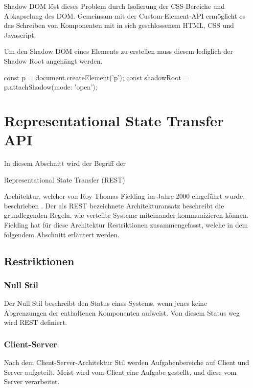 Shadow DOM löst dieses Problem durch Isolierung der CSS-Bereiche und Abkapselung des DOM. 
Gemeinsam mit der Custom-Element-API ermöglicht es das Schreiben von Komponenten mit in sich geschlossenem HTML, CSS und Javascript.


Um den Shadow DOM eines Elements zu erstellen muss diesem lediglich der Shadow Root angehängt werden.
\begin{JsCode}
	const p = document.createElement('p');
	const shadowRoot = p.attachShadow({mode: 'open'});
\end{JsCode}


\section{Representational State Transfer  API}
In diesem Abschnitt wird der Begriff der \begin{english}
Representational State Transfer (REST)
\end{english} Architektur, welcher von Roy Thomas Fielding im Jahre 2000 eingeführt wurde, beschrieben \cite{rest}.
Der als REST bezeichnete Architekturansatz beschreibt die grundlegenden Regeln, wie verteilte Systeme miteinander kommunizieren können.
Fielding hat für diese Architektur Restriktionen zusammengefasst, welche in dem folgendem Abschnitt erläutert werden.
\subsection{Restriktionen}
\subsubsection{Null Stil}
Der Null Stil beschreibt den Status eines Systems, wenn jenes keine Abgrenzungen der enthaltenen Komponenten aufweist. Von diesem Status weg wird REST definiert. 
\subsubsection{Client-Server}
Nach dem Client-Server-Architektur Stil werden Aufgabenbereiche auf Client und Server aufgeteilt. Meist wird vom Client eine Aufgabe gestellt, und diese vom Server verarbeitet. 
